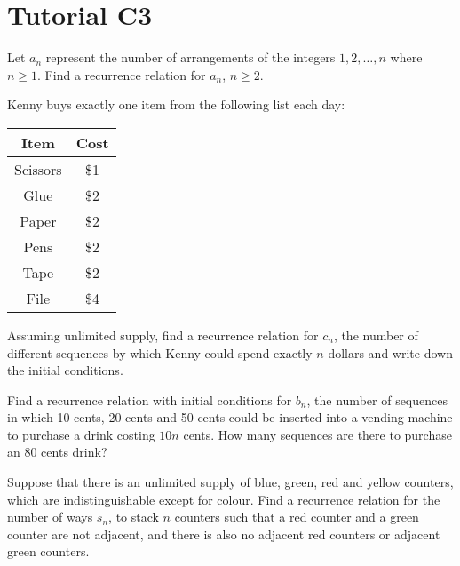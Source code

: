 \section{Tutorial C3}

\begin{problem}
    Let $a_n$ represent the number of arrangements of the integers $1, 2, \dots, n$ where $n \geq 1$. Find a recurrence relation for $a_n$, $n \geq 2$.
\end{problem}

\begin{problem}
    Kenny buys exactly one item from the following list each day:

    \begin{table}[H]
    \centering
    \begin{tabular}{|c|c|}
    \hline
    Item & Cost \\ \hline
    Scissors & \$1 \\ \hline
    Glue & \$2 \\ \hline
    Paper & \$2 \\ \hline
    Pens & \$2 \\ \hline
    Tape & \$2 \\ \hline
    File & \$4 \\ \hline
    \end{tabular}
    \end{table}

    Assuming unlimited supply, find a recurrence relation for $c_n$, the number of different sequences by which Kenny could spend exactly $n$ dollars and write down the initial conditions.
\end{problem}

\begin{problem}
    Find a recurrence relation with initial conditions for $b_n$, the number of sequences in which 10 cents, 20 cents and 50 cents could be inserted into a vending machine to purchase a drink costing $10n$ cents. How many sequences are there to purchase an 80 cents drink?
\end{problem}

\begin{problem}
    Suppose that there is an unlimited supply of blue, green, red and yellow counters, which are indistinguishable except for colour. Find a recurrence relation for the number of ways $s_n$, to stack $n$ counters such that a red counter and a green counter are not adjacent, and there is also no adjacent red counters or adjacent green counters.
\end{problem}


